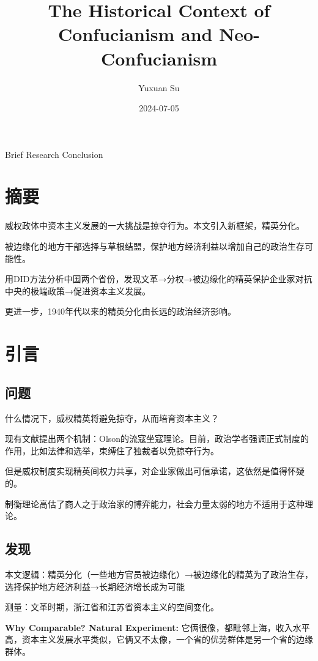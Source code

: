 \documentclass[
]{book}
\title{The Historical Context of Confucianism and Neo-Confucianism}
\author{Yuxuan Su}
\date{2024-07-05}
\begin{document}
\maketitle

{
\setcounter{tocdepth}{1}
\tableofcontents
}
Brief Research Conclusion

\hypertarget{ux6458ux8981}{%
\chapter{摘要}\label{ux6458ux8981}}

威权政体中资本主义发展的一大挑战是掠夺行为。本文引入新框架，精英分化。

被边缘化的地方干部选择与草根结盟，保护地方经济利益以增加自己的政治生存可能性。

用DID方法分析中国两个省份，发现文革→分权→被边缘化的精英保护企业家对抗中央的极端政策→促进资本主义发展。

更进一步，1940年代以来的精英分化由长远的政治经济影响。

\hypertarget{ux5f15ux8a00}{%
\chapter{引言}\label{ux5f15ux8a00}}

\hypertarget{ux95eeux9898}{%
\section{问题}\label{ux95eeux9898}}

什么情况下，威权精英将避免掠夺，从而培育资本主义？

现有文献提出两个机制：Olson的流寇坐寇理论。目前，政治学者强调正式制度的作用，比如法律和选举，束缚住了独裁者以免掠夺行为。

但是威权制度实现精英间权力共享，对企业家做出可信承诺，这依然是值得怀疑的。

制衡理论高估了商人之于政治家的博弈能力，社会力量太弱的地方不适用于这种理论。

\hypertarget{ux53d1ux73b0}{%
\section{发现}\label{ux53d1ux73b0}}

本文逻辑：精英分化（一些地方官员被边缘化）→被边缘化的精英为了政治生存，选择保护地方经济利益→长期经济增长成为可能

测量：文革时期，浙江省和江苏省资本主义的空间变化。

\textbf{Why Comparable? Natural Experiment:} 它俩很像，都毗邻上海，收入水平高，资本主义发展水平类似，它俩又不太像，一个省的优势群体是另一个省的边缘群体。
\end{document}
